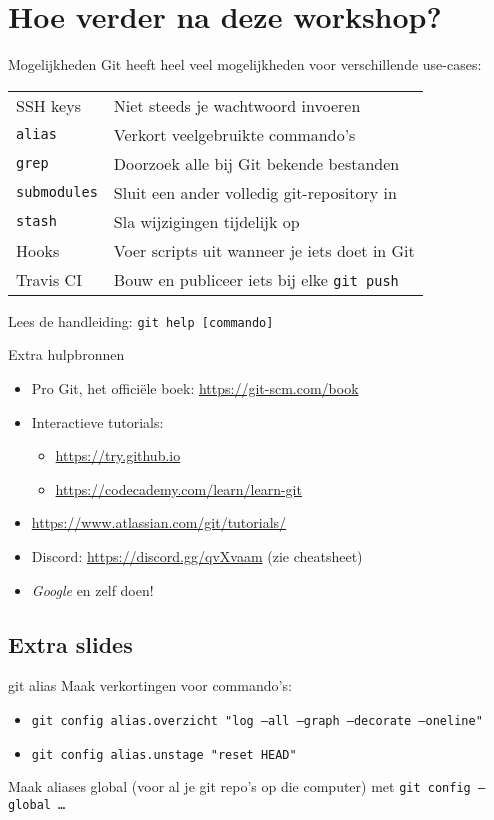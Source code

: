 \section[Hoe verder?]{Hoe verder na deze workshop?}

\begin{frame}{Mogelijkheden}
	Git heeft heel veel mogelijkheden voor verschillende use-cases:
	\begin{center}
		\begin{tabular}{ll}
			SSH keys		& Niet steeds je wachtwoord invoeren \\
			\texttt{alias} & Verkort veelgebruikte commando's \\
			\texttt{grep}	& Doorzoek alle bij Git bekende bestanden \\
			\texttt{submodules} & Sluit een ander volledig git-repository in \\
			\texttt{stash} & Sla wijzigingen tijdelijk op\\
			Hooks & Voer scripts uit wanneer je iets doet in Git \\
			Travis CI & Bouw en publiceer iets bij elke \texttt{git push}
		\end{tabular}
	\end{center}
	Lees de handleiding: \texttt{git help [commando]}
\end{frame}

\begin{frame}{Extra hulpbronnen}
	\begin{itemize}
		\item Pro Git, het offici\"ele boek: \url{https://git-scm.com/book}
		\item Interactieve tutorials:
			\begin{itemize}
				\item \url{https://try.github.io}
				\item \url{https://codecademy.com/learn/learn-git}
			\end{itemize}
		\item \url{https://www.atlassian.com/git/tutorials/}
		\item Discord: \url{https://discord.gg/qvXvaam} (zie cheatsheet)
		\item \emph{Google} en zelf doen!
	\end{itemize}
\end{frame}

\subsection{Extra slides}
\begin{frame}{git alias}
	Maak verkortingen voor commando's:
	\begin{itemize}
		\item \texttt{git config alias.overzicht "log --all --graph --decorate --oneline"}
		\item \texttt{git config alias.unstage "reset HEAD"}
	\end{itemize}
	Maak aliases global (voor al je git repo's op die computer) met \texttt{git config --global \ldots}
\end{frame}

